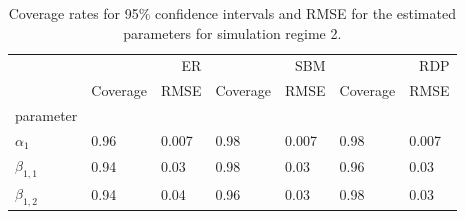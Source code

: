 \begin{table}[ht]
\centering
\caption{Coverage rates for 95\% confidence intervals and RMSE for the estimated parameters for simulation regime 2.}
\label{tab:regime_2_params}
\begin{tabular}{lllllll}
\toprule
 & \multicolumn{2}{r}{ER} & \multicolumn{2}{r}{SBM} & \multicolumn{2}{r}{RDP} \\
 & Coverage & RMSE & Coverage & RMSE & Coverage & RMSE \\
parameter &  &  &  &  &  &  \\
\midrule
$\alpha_{1}$ & 0.96 & 0.007 & 0.98 & 0.007 & 0.98 & 0.007 \\
$\beta_{1,1}$ & 0.94 & 0.03 & 0.98 & 0.03 & 0.96 & 0.03 \\
$\beta_{1,2}$ & 0.94 & 0.04 & 0.96 & 0.03 & 0.98 & 0.03 \\
\bottomrule
\end{tabular}

\end{table}
